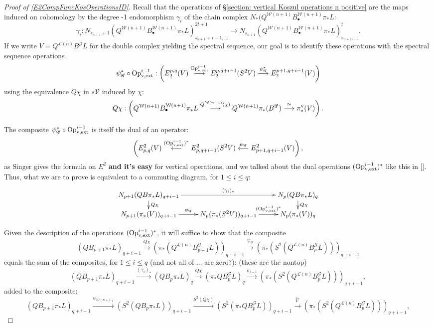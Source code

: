 \documentclass[11pt]{amsart}
\theoremstyle{plain}
\theoremstyle{definition}
\renewcommand{\to}{\longrightarrow}
\newcommand{\from}{\longleftarrow}
\newcommand{\scrG}{\mathscr{G}}
\newcommand{\calW}{\mathcal{W}}
\newcommand{\calL}{\mathcal{L}}
\newcommand{\calV}{\mathcal{V}}
\theoremstyle{plain}
\newcommand{\BSW}{{\scrG}}
\newcommand{\BSWres}{B^\BSW}%
\newcommand{\vExtCohOp}{\textup{Op}_\textup{v,ext}}
\begin{document}
\begin{Composite functor spectral sequences}
\begin{tricky proofs of operation compatibilities}
\begin{proof}[Proof of \ref{E2CompFuncKosOperationsID}]
Recall that the operations of \S\ref{section: vertical Koszul operations n positive} are the maps induced on cohomology by the degree -1 endomorphism $\gamma_i$ of the chain complex $N_*(Q^{\calW(n+1)} B^{\calW(n+1)}_{\bullet}\pi_*L$:
\[\gamma_i:N_{s_{n+1}+1}(Q^{\calW(n+1)} B^{\calW(n+1)}_{\bullet}\pi_*L)^{2t+1}_{s_{n+1}+i-1,\ldots}\to N_{s_{n+1}}(Q^{\calW(n+1)} B^{\calW(n+1)}_{\bullet}\pi_*L)^{t}_{s_{n+1},\ldots}.\]
If we write $V=Q^{\calL(n)}\BSWres L$ for the double complex yielding the spectral sequence, our goal is to identify these operations with the spectral sequence operations
\[\psi_{\BSW}^*\circ\vExtCohOp^{i-1}:\left(E^{p,q}_2(V)\overset{\vExtCohOp^{i-1}}{\to} E^{p,q+i-1}_2(S^2V)\overset{\psi_{\BSW}^*}{\to}E^{p+1,q+i-1}_2(V)\right)\]
using the equivalence $Q\chi$ in $s\calV$ induced by $\chi$:%
\[Q\chi:\left(Q^{\calW(n+1)}B^{\calW(n+1)}_{\bullet} \pi_*L\overset{Q^{\calW(n+1)}(\chi)}{\to} Q^{\calW(n+1)}\pi_*(\BSWres )\overset{\cong }{\to}\pi_*^\textup{v}(V)\right).\]

The composite $\psi_{\BSW}^*\circ\vExtCohOp^{i-1}$ is itself the dual of an operator:
\[\left(E_{p,q}^2(V)\overset{(\vExtCohOp^{i-1})^*}{\from} E_{p,q+i-1}^2(S^2V)\overset{\psi_{\BSW}}{\from}E_{p+1,q+i-1}^2(V)\right),\]
as Singer gives the formula on $E^2$ \textbf{and it's easy} for vertical operations, and we talked about the dual operations $(\vExtCohOp^{i-1})^*$ like this in []. Thus, what we are to prove is equivalent to a commuting diagram, for $1\leq i\leq q$:
\[\xymatrix@R=4mm{
N_{p+1}(QB\pi_*L)_{q+i-1}\ar[rr]^-{(\gamma_i)_*}
\ar[d]^-{Q\chi}
&%
&%
N_p(QB\pi_*L)_q\ar[d]^-{Q\chi}
\\%
N_{p+1}(\pi_*(V))_{q+i-1}\ar[r]^-{\psi_{\BSW}}
&%
N_{p}(\pi_*(S^2V))_{q+i-1}\ar[r]^-{(\vExtCohOp^{i-1})^*}
&%
N_p(\pi_*(V))_q%
}\]

Given the description of the operations $(\vExtCohOp^{i-1})^*$, it will suffice to show that the composite
\[(QB_{p+1}\pi_*L)_{q+i-1}\overset{Q\chi}{\to}(\pi_*(Q^{\calL(n)}\BSWres_{p+1}L))_{q+i-1}\overset{\psi_{\BSW}}{\to}(\pi_*(S^2(Q^{\calL(n)}\BSWres_pL)))_{q+i-1}\]
equals the sum of the composites, for $1\leq i \leq q$ (and not all of ... are zero?): (these are the nontop)
\[(QB_{p+1}\pi_* L)_{q+i-1}\overset{(\gamma_i)_*}{\to} (QB_{p}\pi_* L)_q\overset{Q\chi}{\to} (\pi_*Q\BSWres_{p}L)_q\overset{\sigma_{i-1}}{\to} (\pi_*(S^2(Q^{\calL(n)}\BSWres_{p}L)))_{q+i-1},\]
added to the composite:
\[(QB_{p+1}\pi_* L)_{q+i-1}\overset{\psi_{\calW(n+1)}}{\to}(S^2(QB_{p}\pi_* L))_{q+i-1}\overset{S^2(Q\chi)}{\to}
(S^2(\pi_*Q\BSWres_pL))_{q+i-1}\overset{\widetilde{\nabla}}{\to}
(\pi_*(S^2(Q^{\calL(n)}\BSWres_{p}L)))_{q+i-1},\]



\end{proof}
\end{tricky proofs of operation compatibilities}
\end{Composite functor spectral sequences}
\end{document}

